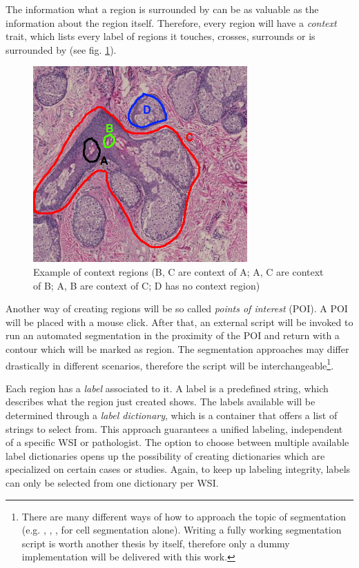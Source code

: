 The information what a region is surrounded by can be as valuable as the information about the region itself\cite{Bankman00}. Therefore, every region will have a \emph{context} trait, which lists every label of regions it touches, crosses, surrounds or is surrounded by (see fig. \ref{fig4_contextregions}).

\begin{figure}[H]
	\begin{center}
		\includegraphics[scale=0.5]{img/contextregions.png}
		\caption{Example of context regions (B, C are context of A; A, C are context of B; A, B are context of C; D has no context region)}
		\label{fig4_contextregions}
	\end{center}
\end{figure}

Another way of creating regions will be so called \emph{points of interest} (POI). A POI will be placed with a mouse click. After that, an external script will be invoked to run an automated segmentation in the proximity of the POI and return with a contour which will be marked as region. The segmentation approaches may differ drastically in different scenarios\cite{Liu12}, therefore the script will be interchangeable\footnote{There are many different ways of how to approach the topic of segmentation (e.g. \cite{Qi12}, \cite{Sharma16}, \cite{Wienert12}, \cite{Angulo10} for cell segmentation alone). Writing a fully working segmentation script is worth another thesis by itself, therefore only a dummy implementation will be delivered with this work.}.

Each region has a \emph{label} associated to it. A label is a predefined string, which describes what the region just created shows. The labels available will be determined through a \emph{label dictionary}, which is a container that offers a list of strings to select from. This approach guarantees a unified labeling, independent of a specific WSI or pathologist. The option to choose between multiple available label dictionaries opens up the possibility of creating dictionaries which are specialized on certain cases or studies. Again, to keep up labeling integrity, labels can only be selected from one dictionary per WSI.

